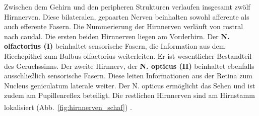 \documentclass[12pt,a4paper,pdftex]{article}
\begin{document}
Zwischen dem Gehirn und den peripheren Strukturen verlaufen insgesamt zwölf Hirnnerven. Diese bilateralen, gepaarten Nerven beinhalten sowohl afferente als auch efferente Fasern. Die Nummerierung der Hirnnerven verläuft von rostral nach caudal. Die ersten beiden Hirnnerven liegen am Vorderhirn. Der \textbf{N. olfactorius (I)} beinhaltet sensorische Fasern, die Information aus dem Riechepithel zum Bulbus olfactorius weiterleiten. Er ist wesentlicher Bestandteil des Geruchssinns. Der zweite Hirnnerv, der \textbf{N. opticus (II)} beinhaltet ebenfalls ausschließlich sensorische Fasern. Diese leiten Informationen aus der Retina zum Nucleus geniculatum laterale weiter. Der N. opticus ermöglicht das Sehen und ist zudem am Pupillenreflex beteiligt. Die restlichen Hirnnerven sind am Hirnstamm lokalisiert (Abb.~\ref{fig:hirnnerven_schaf}) \textsuperscript{\cite[10]{crossman2014neuroanatomy}}. \\
\end{document}

